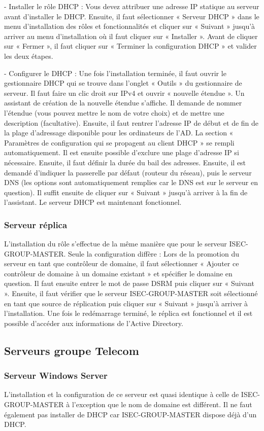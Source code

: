 -	Installer le rôle DHCP :
Vous devez attribuer une adresse IP statique au serveur avant d’installer le DHCP.
Ensuite, il faut sélectionner « Serveur DHCP » dans le menu d’installation des rôles et fonctionnalités et cliquer sur « Suivant » jusqu’à arriver au menu d’installation où il faut cliquer sur « Installer ». Avant de cliquer sur « Fermer », il faut cliquer sur « Terminer la configuration DHCP » et valider les deux étapes.

-	Configurer le DHCP :
Une fois l’installation terminée, il faut ouvrir le gestionnaire DHCP qui se trouve dans l’onglet « Outils » du gestionnaire de serveur. Il faut faire un clic droit sur IPv4 et ouvrir « nouvelle étendue ». Un assistant de création de la nouvelle étendue s’affiche. Il demande de nommer l’étendue (vous pouvez mettre le nom de votre choix) et de mettre une description (facultative). 
Ensuite, il faut rentrer l’adresse IP de début et de fin de la plage d’adressage disponible pour les ordinateurs de l’AD. La section « Paramètres de configuration qui se propagent au client DHCP » se rempli automatiquement. Il est ensuite possible d’exclure une plage d’adresse IP si nécessaire. Ensuite, il faut définir la durée du bail des adresses. Ensuite, il est demandé d’indiquer la passerelle par défaut (routeur du réseau), puis le serveur DNS (les options sont automatiquement remplies car le DNS est sur le serveur en question). Il suffit ensuite de cliquer sur « Suivant » jusqu’à arriver à la fin de l’assistant. 
Le serveur DHCP est maintenant fonctionnel.

		\subsubsection{Serveur réplica}
L’installation du rôle s’effectue de la même manière que pour le serveur ISEC-GROUP-MASTER. Seule la configuration diffère : Lors de la promotion du serveur en tant que contrôleur de domaine, il faut sélectionner « Ajouter ce contrôleur de domaine à un domaine existant » et spécifier le domaine en question. Il faut ensuite entrer le mot de passe DSRM puis cliquer sur « Suivant ». Ensuite, il faut vérifier que le serveur ISEC-GROUP-MASTER soit sélectionné en tant que source de réplication puis cliquer sur « Suivant » jusqu’à arriver à l’installation. Une fois le redémarrage terminé, le réplica est fonctionnel et il est possible d’accéder aux informations de l’Active Directory.
	\subsection{Serveurs groupe Telecom}
		\subsubsection{Serveur Windows Server}
L’installation et la configuration de ce serveur est quasi identique à celle de ISEC-GROUP-MASTER à l’exception que le nom de domaine est différent. Il ne faut également pas installer de DHCP car ISEC-GROUP-MASTER dispose déjà d’un DHCP.